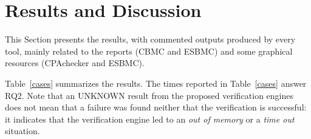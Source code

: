 
\section{Results and Discussion}
\label{sec:results_indeed}

This Section presents the results, with commented outputs produced by every tool, mainly related to the reports (CBMC and ESBMC) and some graphical resources (CPAchecker and ESBMC).

%
Table~\ref{cases} summarizes the results. The times reported in Table~\ref{cases} answer RQ2. 
Note that an UNKNOWN result from the proposed verification engines does not mean that a failure was found neither that the verification is successful: it indicates that the verification engine led to an \textit{out of memory} or a \textit{time out} situation.

